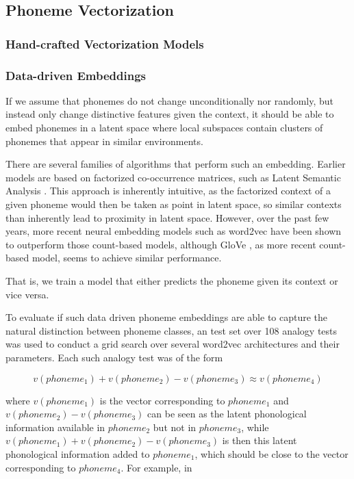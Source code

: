 \documentclass[8pt]{article}
\begin{document}
\subsection{Phoneme Vectorization}
\subsubsection{Hand-crafted Vectorization Models}
\subsubsection{Data-driven Embeddings}




If we assume that phonemes do not change unconditionally nor randomly, but instead only change distinctive features given the context, it should be able to embed phonemes in a latent space where local subspaces contain clusters of phonemes that appear in similar environments. 

There are several families of algorithms that perform such an embedding. Earlier models are based on factorized co-occurrence matrices, such as Latent Semantic Analysis \cite{landauer2013handbook}. This approach is inherently intuitive, as the factorized context of a given phoneme would then be taken as point in latent space, so similar contexts than inherently lead to proximity in latent space. However, over the past few years, more recent neural embedding models such as word2vec \cite{mikolov2013efficient,mikolov2013distributed,goldberg2014word2vec}  have been shown to outperform those count-based models, although GloVe \cite{pennington2014glove}, as more recent count-based model, seems to achieve similar performance.


That is, we train a model that either predicts the phoneme given its context or vice versa.  


To evaluate if such data driven phoneme embeddings are able to capture the natural distinction between phoneme classes, an test set over 108 analogy tests was used to conduct a grid search over several word2vec architectures and their parameters. Each such analogy test was of the form

\begin{equation}
v(phoneme_1) + v(phoneme_2) -  v(phoneme_3) \approx v(phoneme_4)
\end{equation} 

where $v(phoneme_1)$ is the vector corresponding to $phoneme_1$ and $v(phoneme_2) - v(phoneme_3)$ can be seen as the latent phonological information available in $phoneme_2$ but not in $phoneme_3$,  while $v(phoneme_1) + v(phoneme_2) -  v(phoneme_3) $ is then this latent phonological information added to $phoneme_1$, which should be close to the vector corresponding to $phoneme_4$. For example, in
\end{document}

